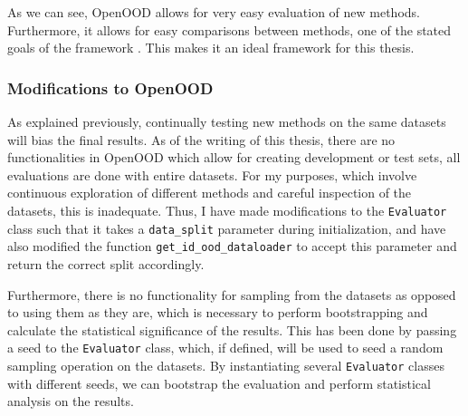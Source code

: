 \documentclass[UKenglish]{uiomasterthesis} %
\theoremstyle{definition}
\begin{document}
As we can see, OpenOOD allows for very easy evaluation of new methods. Furthermore, it allows for easy comparisons between methods, one of the stated goals of the framework \cite{openood}. This makes it an ideal framework for this thesis.


\subsubsection{Modifications to OpenOOD}

As explained previously, continually testing new methods on the same datasets will bias the final results. As of the writing of this thesis, there are no functionalities in OpenOOD which allow for creating development or test sets, all evaluations are done with entire datasets. For my purposes, which involve continuous exploration of different methods and careful inspection of the datasets, this is inadequate. Thus, I have made modifications to the \texttt{Evaluator} class such that it takes a \texttt{data\_split} parameter during initialization, and have also modified the function \texttt{get\_id\_ood\_dataloader} to accept this parameter and return the correct split accordingly.

Furthermore, there is no functionality for sampling from the datasets as opposed to using them as they are, which is necessary to perform bootstrapping and calculate the statistical significance of the results. This has been done by passing a seed to the \texttt{Evaluator} class, which, if defined, will be used to seed a random sampling operation on the datasets. By instantiating several \texttt{Evaluator} classes with different seeds, we can bootstrap the evaluation and perform statistical analysis on the results.
\end{document}
